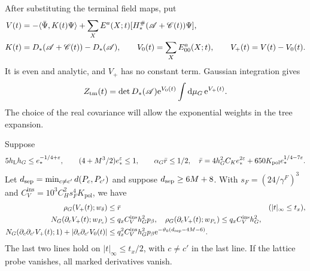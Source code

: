 After substituting the terminal field maps, put
\begin{align}
 V(t)&=-\langle\bar\Psi,K(t)\Psi\rangle
           +\sum_X E^a(X;t)[H_*^\#(\mathscr A+\mathscr C(t))\Psi],
                                                        \notag\\
 K(t)&=D_*(\mathscr A+\mathscr C(t))-D_*(\mathscr A),\qquad
 V_0(t)=\sum_XE^a_{00}(X;t),\qquad V_+(t)=V(t)-V_0(t).
                                    \label{eq:interacting-tree-interaction}
\end{align}
It is even and analytic, and $V_+$ has no
constant term. Gaussian integration gives
\begin{equation}\label{eq:interacting-real-Gaussian-factor}
 Z_{\rm tm}(t)=\det D_*(\mathscr A)\mathrm e^{V_0(t)}
                                  \int\mathrm d\mu_G\,\mathrm e^{V_+(t)} .
\end{equation}
The choice of the real covariance will allow
the exponential weights in the tree expansion.

\begin{proposition}\label{prop:interacting-differentiated-norms}
Suppose
\begin{equation}\label{eq:interacting-tree-smallness}
 5h_{\rm L}h_G\le e_*^{-1/4+\varepsilon},\qquad
 (4+M^3/2)e_*^\varepsilon\le1,\qquad
 \alpha_G\bar r\le1/2,
 \quad
 \bar r=4h_G^2C_Ke_*^{2\varepsilon}
                            +650K_{\mathrm{pol}}e_*^{1/4-7\varepsilon}.
\end{equation}
Let $d_{\rm sep}=\min_{c\ne c'}d(P_c,P_{c'})$ and
suppose $d_{\rm sep}\ge6M+8$.
With
$s_F=(24/\gamma^F)^3$ and
$C_V^{\mathrm{ins}}=10^3C_H^2s_F^4K_{\mathrm{pol}}$, we have
\begin{align}
 \rho_G(V_+(t);w_\delta)&\le\bar r
                                      &&(|t|_\infty\le t_x),\notag\\
 N_G(\partial_cV_+(t);w_{P_c})&\le q_xC_V^{\mathrm{ins}}h_G^2p_\beta,
 \quad
 \rho_G(\partial_cV_+(t);w_{P_c})\le q_xC_V^{\mathrm{ins}}h_G^2,\notag\\
 N_G(\partial_c\partial_{c'}V_+(t);1)
          +|\partial_c\partial_{c'}V_0(t)|
 &\le q_x^2C_V^{\mathrm{ins}}h_G^2p_\beta
                    \mathrm e^{-\vartheta_0(d_{\rm sep}-4M-6)} .
                             \label{eq:interacting-differentiated-norms}
\end{align}
The last two lines hold on $|t|_\infty\le t_x/2$,
with $c\ne c'$ in the last line. If the lattice
probe vanishes, all marked derivatives vanish.
\end{proposition}

